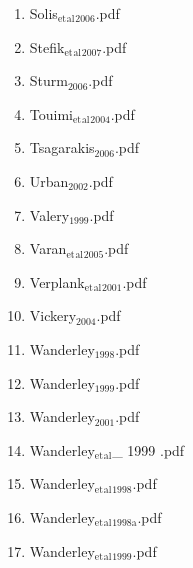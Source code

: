 \documentclass[11pt]{article}
\begin{document}
\begin{enumerate}
\begin{enumerate}
\item Solis$_{\text{et}}$$_{\text{al}}$$_{\text{2006}}$.pdf
\label{sec-1-1-1-1-11-19-17-146}

\item Stefik$_{\text{et}}$$_{\text{al}}$$_{\text{2007}}$.pdf
\label{sec-1-1-1-1-11-19-17-147}

\item Sturm$_{\text{2006}}$.pdf
\label{sec-1-1-1-1-11-19-17-148}

\item Touimi$_{\text{et}}$$_{\text{al}}$$_{\text{2004}}$.pdf
\label{sec-1-1-1-1-11-19-17-149}

\item Tsagarakis$_{\text{2006}}$.pdf
\label{sec-1-1-1-1-11-19-17-150}

\item Urban$_{\text{2002}}$.pdf
\label{sec-1-1-1-1-11-19-17-151}

\item Valery$_{\text{1999}}$.pdf
\label{sec-1-1-1-1-11-19-17-152}

\item Varan$_{\text{et}}$$_{\text{al}}$$_{\text{2005}}$.pdf
\label{sec-1-1-1-1-11-19-17-153}

\item Verplank$_{\text{et}}$$_{\text{al}}$$_{\text{2001}}$.pdf
\label{sec-1-1-1-1-11-19-17-154}

\item Vickery$_{\text{2004}}$.pdf
\label{sec-1-1-1-1-11-19-17-155}

\item Wanderley$_{\text{1998}}$.pdf
\label{sec-1-1-1-1-11-19-17-156}

\item Wanderley$_{\text{1999}}$.pdf
\label{sec-1-1-1-1-11-19-17-157}

\item Wanderley$_{\text{2001}}$.pdf
\label{sec-1-1-1-1-11-19-17-158}

\item Wanderley$_{\text{et}}$$_{\text{al}}$\_ 1999 .pdf
\label{sec-1-1-1-1-11-19-17-159}

\item Wanderley$_{\text{et}}$$_{\text{al}}$$_{\text{1998}}$.pdf
\label{sec-1-1-1-1-11-19-17-160}

\item Wanderley$_{\text{et}}$$_{\text{al}}$$_{\text{1998a}}$.pdf
\label{sec-1-1-1-1-11-19-17-161}

\item Wanderley$_{\text{et}}$$_{\text{al}}$$_{\text{1999}}$.pdf
\label{sec-1-1-1-1-11-19-17-162}


\end{enumerate}
\end{enumerate}
\end{document}
